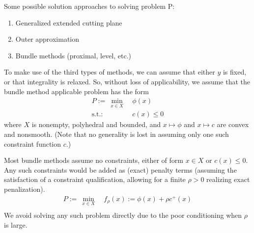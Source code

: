 \documentclass[xcolor=dvipsnames]{beamer}
\begin{document}
\begin{frame}
Some possible solution approaches to solving problem P:
\begin{enumerate}
\item Generalized extended cutting plane
\item Outer approximation
\item Bundle methods (proximal, level, etc.)
\end{enumerate}
To make use of the third types of methods, we can assume that either $y$ is fixed, or that integrality is relaxed.
So, without loss of applicability, we assume that the bundle method applicable problem has the form
    \begin{align*}    
      P:= ~ \min_{x \in X } \ & \phi(x) \\
        \text{s.t.: } &c(x) \le 0
    \end{align*} 
where $X$ is nonempty, polyhedral and bounded, and $x \mapsto \phi$ and $x \mapsto c$ are convex and nonsmooth.
(Note that no generality is lost in assuming only one such constraint function $c$.)
\end{frame}

\begin{frame}
Most bundle methods assume \alert{no} constraints, either of form $x \in X$ or $c(x) \le 0$.
Any such constraints would be added as (exact) penalty terms (assuming the satisfaction of a constraint qualification,
allowing for a finite $\rho > 0$ realizing exact penalization).
    \begin{align*}    
      P := ~ \min_{x \in X } \ & f_\rho(x) := \phi(x) + \rho c^+(x) \\
    \end{align*} 
We avoid solving any such problem \alert{directly} due to the poor conditioning when $\rho$ is large.
\end{frame}
\end{document}
